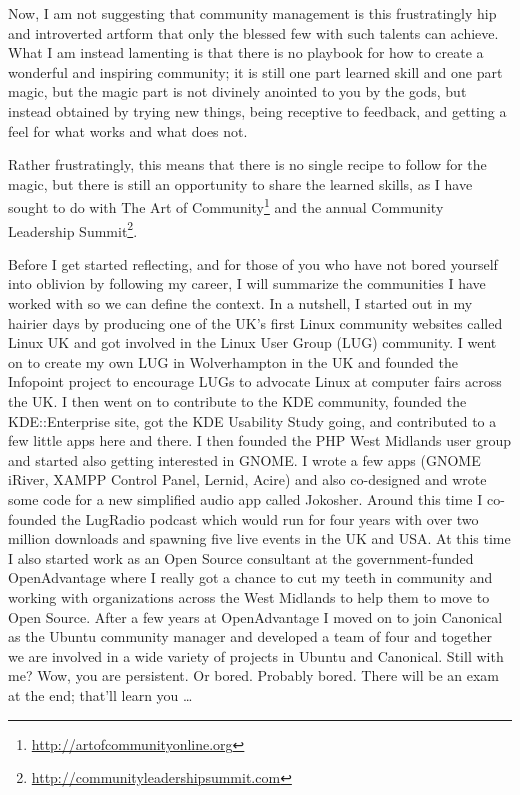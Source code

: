 Now, I am not suggesting that community management is this frustratingly hip and
introverted artform that only the blessed few with such talents can achieve.
What I am instead lamenting is that there is no playbook for how to create a
wonderful and inspiring community; it is still one part learned skill and one
part magic, but the magic part is not divinely anointed to you by the gods, but
instead obtained by trying new things, being receptive to feedback, and getting
a feel for what works and what does not.

Rather frustratingly, this means that there is no single recipe to follow for
the magic, but there is still an opportunity to share the learned skills, as I
have sought to do with The Art of
Community\footnote{\url{http://artofcommunityonline.org}} and the annual
Community Leadership
Summit\footnote{\url{http://communityleadershipsummit.com}}.

Before I get started reflecting, and for those of you who have not bored
yourself into oblivion by following my career, I will summarize the communities
I have worked with so we can define the context. In a nutshell, I started out in
my hairier days by producing one of the UK’s first Linux community websites
called Linux UK and got involved in the Linux User Group (LUG) community. I went
on to create my own LUG in Wolverhampton in the UK and founded the Infopoint
project to encourage LUGs to advocate Linux at computer fairs across the UK. I
then went on to contribute to the KDE community, founded the KDE::Enterprise
site, got the KDE Usability Study going, and contributed to a few little apps
here and there. I then founded the PHP West Midlands user group and started also
getting interested in GNOME. I wrote a few apps (GNOME iRiver, XAMPP Control
Panel, Lernid, Acire) and also co-designed and wrote some code for a new
simplified audio app called Jokosher. Around this time I co-founded the LugRadio
podcast which would run for four years with over two million downloads and
spawning five live events in the UK and USA. At this time I also started work as
an Open Source consultant at the government-funded OpenAdvantage where I really
got a chance to cut my teeth in community and working with organizations across
the West Midlands to help them to move to Open Source. After a few years at
OpenAdvantage I moved on to join Canonical as the Ubuntu community manager and
developed a team of four and together we are involved in a wide variety of
projects in Ubuntu and Canonical.
\newline
Still with me?
\newline
Wow, you are persistent. Or bored. Probably bored. There will be an exam at the
end; that’ll learn you \dots

